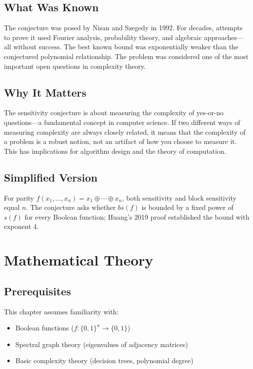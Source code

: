 \subsection{What Was Known}
The conjecture was posed by Nisan and Szegedy in 1992. For decades, attempts to prove it used Fourier analysis, probability theory, and algebraic approaches---all without success. The best known bound was exponentially weaker than the conjectured polynomial relationship. The problem was considered one of the most important open questions in complexity theory.

\subsection{Why It Matters}
The sensitivity conjecture is about measuring the complexity of yes-or-no questions---a fundamental concept in computer science. If two different ways of measuring complexity are always closely related, it means that the complexity of a problem is a robust notion, not an artifact of how you choose to measure it. This has implications for algorithm design and the theory of computation.

\subsection{Simplified Version}
For parity $f(x_1,\ldots,x_n)=x_1\oplus\cdots\oplus x_n$, both sensitivity and block sensitivity equal $n$. The conjecture asks whether $bs(f)$ is bounded by a fixed power of $s(f)$ for every Boolean function; Huang's 2019 proof established the bound with exponent 4.

\section{Mathematical Theory}

\subsection{Prerequisites}
This chapter assumes familiarity with:
\begin{itemize}
\item Boolean functions ($f: \{0,1\}^n \to \{0,1\}$)
\item Spectral graph theory (eigenvalues of adjacency matrices)
\item Basic complexity theory (decision trees, polynomial degree)
\end{itemize}

